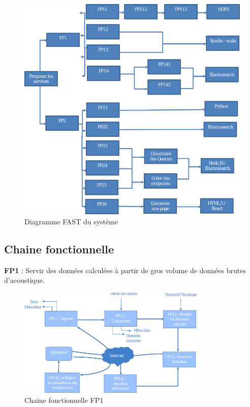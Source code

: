 \documentclass[a4paper]{article}
\begin{document}
\begin{figure}[h]
	\centering
	\includegraphics[width=\textwidth]{./tmp/DiagFast.png}
	\caption{Diagramme FAST du système}
\end{figure}

\newpage
\subsection{Chaine fonctionnelle}

\textbf{FP1} : Servir des données calculées à partir de gros volume de données brutes d’acoustique.

\begin{figure}[h]
\centering
	\includegraphics[width=0.8\textwidth]{./tmp/ChaineFonct.png}
	\caption{Chaine fonctionnelle FP1}
\end{figure}
\end{document}
